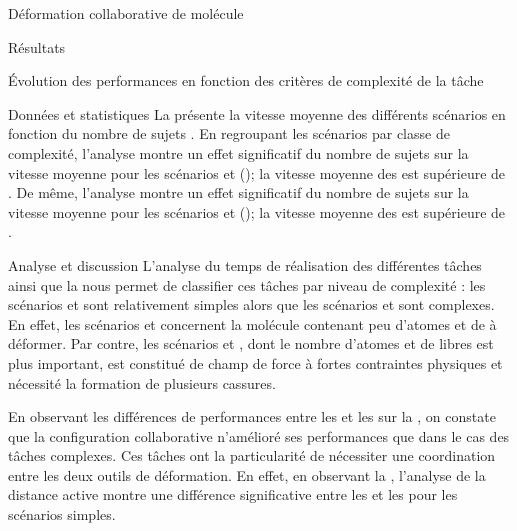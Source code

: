 \documentclass[myfrancais,ngerman,english,french]{mythesis}
\begin{document}
\begin{mychapter}{Déformation collaborative de molécule}
\begin{mysection}{Résultats}
\begin{mysubsection}{Évolution des performances en fonction des critères de complexité de la tâche}
\begin{mysubsubsection}{Données et statistiques}
					La  présente la vitesse moyenne  des différents scénarios  en fonction du nombre de sujets .
					En regroupant les scénarios par classe de complexité, l'analyse montre un effet significatif du nombre de sujets  sur la vitesse moyenne  pour les scénarios  et  (); la vitesse moyenne des  est supérieure de .
					De même, l'analyse montre un effet significatif du nombre de sujets  sur la vitesse moyenne  pour les scénarios  et  (); la vitesse moyenne des  est supérieure de .
				\end{mysubsubsection}
				\begin{mysubsubsection}{Analyse et discussion}
					L'analyse du temps de réalisation des différentes tâches ainsi que la  nous permet de classifier ces tâches par niveau de complexité : les scénarios  et  sont relativement simples alors que les scénarios  et  sont complexes.
					En effet, les scénarios  et  concernent la molécule \myTRPZIPPER contenant peu d'atomes et de  à déformer.
					Par contre, les scénarios  et , dont le nombre d'atomes et de  libres est plus important, est constitué de champ de force à fortes contraintes physiques et nécessité la formation de plusieurs cassures.

					En observant les différences de performances entre les  et les  sur la , on constate que la configuration collaborative n'amélioré ses performances que dans le cas des tâches complexes.
					Ces tâches ont la particularité de nécessiter une coordination entre les deux outils de déformation.
					En effet, en observant la , l'analyse de la distance active montre une différence significative entre les  et les  pour les scénarios simples.


\end{mysubsubsection}
\end{mysubsection}
\end{mysection}
\end{mychapter}
\end{document}
